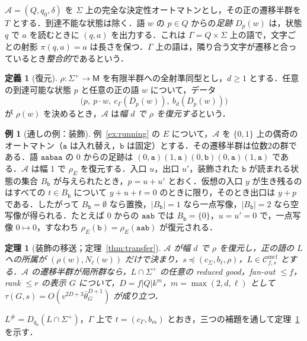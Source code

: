 \documentclass[11pt,a4paper]{ltjsarticle}
\numberwithin{equation}{section}
\theoremstyle{plain}
\theoremstyle{definition}
\newtheorem{definition}[theorem]{定義}
\newtheorem{example}[theorem]{例}
\theoremstyle{remark}
\theoremstyle{plain}
\newtheorem{mainthm}{定理}
\newcommand{\Cmcf}[2]{\mathcal{C}^{\mathrm{mcf}}_{#1,#2}}
\newcommand{\bth}{\bar\theta}
\begin{document}
$\mathcal A=(Q,q_0,\delta)$ を $\Sigma$ 上の完全な決定性オートマトンとし，その正の遷移半群を $T$ とする．到達不能な状態は除く．語 $w$ の $p\in Q$ からの\emph{足跡} $D_p(w)$ は，状態 $q$ で $a$ を読むときに $(q,a)$ を出力する．これは $\Gamma=Q\times\Sigma$ 上の語で，文字ごとの射影 $\pi(q,a)=a$ は長さを保つ．$\Gamma$ 上の語は，隣り合う文字が遷移と合っているとき\emph{整合的}であるという．

\begin{definition}[復元]
\label{def:recovery}
$\rho:\Sigma^+\to\mathsf M$ を有限半群への全射準同型とし，$d\ge1$ とする．任意の到達可能な状態 $p$ と任意の正の語 $w$ について，データ
\[
  \bigl(p,\ p\cdot w,\ c_\Gamma(D_p(w)),\ b_d(D_p(w))\bigr)
\]
が $\rho(w)$ を決めるとき，$\mathcal A$ は\emph{幅 $d$ で $\rho$ を復元する}という．
\end{definition}

\begin{example}[通しの例：装飾]
\label{ex:running-decoration}
例~\ref{ex:running} の $E$ について，$\mathcal A$ を $\{0,1\}$ 上の偶奇のオートマトン（$\mathtt a$ は入れ替え，$\mathtt b$ は固定）とする．その遷移半群は位数2の群である．語 $\mathtt{aabaa}$ の $0$ からの足跡は $(0,\mathtt a)(1,\mathtt a)(0,\mathtt b)(0,\mathtt a)(1,\mathtt a)$ である．$\mathcal A$ は幅 1 で $\rho_E$ を復元する．入口 $u$，出口 $u'$，装飾された $\mathtt b$ が読まれる状態の集合 $B_{\mathtt b}$ が与えられたとき，$p=u+u'$ とおく．仮想の入口 $y$ が生き残るのはすべての $t\in B_{\mathtt b}$ について $y+u+t=0$ のときに限り，そのとき出口は $y+p$ である．したがって $B_{\mathtt b}=\emptyset$ なら置換，$|B_{\mathtt b}|=1$ なら一点写像，$|B_{\mathtt b}|=2$ なら空写像が得られる．たとえば $0$ からの $\mathtt{aab}$ では $B_{\mathtt b}=\{0\}$，$u=u'=0$ で，一点写像 $0\mapsto0$，すなわち $\rho_E(\mathtt b)=\rho_E(\mathtt{aab})$ が復元される．
\end{example}

\setcounter{mainthm}{1}%
\begin{mainthm}[装飾の移送；定理~\ref{thm:transfer}]
\label{thm:B}
$\mathcal A$ が幅 $d$ で $\rho$ を復元し，正の語の $L$ への所属が $(\rho(w),N_\ell(w))$ だけで決まり，$s\preceq(c_\Sigma,b_\ell,\rho)$，$L\in\Cmcf{f}{s}$ とする．$\mathcal A$ の遷移半群が局所群なら，$L\cap\Sigma^+$ の任意の reduced good，fan-out $\le f$，rank $\le r$ の表示 $G$ について，$D=f|Q|k^m$，$m=\max(2,d,\ell)$ として $\tau(G,s)=O(v^{2D+3}\bth_G^{D+1})$ が成り立つ．
\end{mainthm}

$L^\#=D_{q_0}(L\cap\Sigma^+)$，$\Gamma$ 上で $t=(c_\Gamma,b_m)$ とおき，三つの補題を通して定理~\ref{thm:B} を示す．
\end{document}
